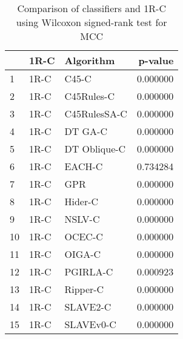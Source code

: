\begin{table}
\footnotesize
\caption{Comparison of classifiers and 1R-C using Wilcoxon signed-rank test for MCC}
\label{tab:1R-C wilcoxon MCC comparison}
\begin{tabular}{lllr}
\hline
 & 1R-C & Algorithm & p-value \\
\hline
1 & 1R-C & C45-C & 0.000000 \\
2 & 1R-C & C45Rules-C & 0.000000 \\
3 & 1R-C & C45RulesSA-C & 0.000000 \\
4 & 1R-C & DT GA-C & 0.000000 \\
5 & 1R-C & DT Oblique-C & 0.000000 \\
6 & 1R-C & EACH-C & 0.734284 \\
7 & 1R-C & GPR & 0.000000 \\
8 & 1R-C & Hider-C & 0.000000 \\
9 & 1R-C & NSLV-C & 0.000000 \\
10 & 1R-C & OCEC-C & 0.000000 \\
11 & 1R-C & OIGA-C & 0.000000 \\
12 & 1R-C & PGIRLA-C & 0.000923 \\
13 & 1R-C & Ripper-C & 0.000000 \\
14 & 1R-C & SLAVE2-C & 0.000000 \\
15 & 1R-C & SLAVEv0-C & 0.000000 \\
\hline
\end{tabular}
\end{table}
